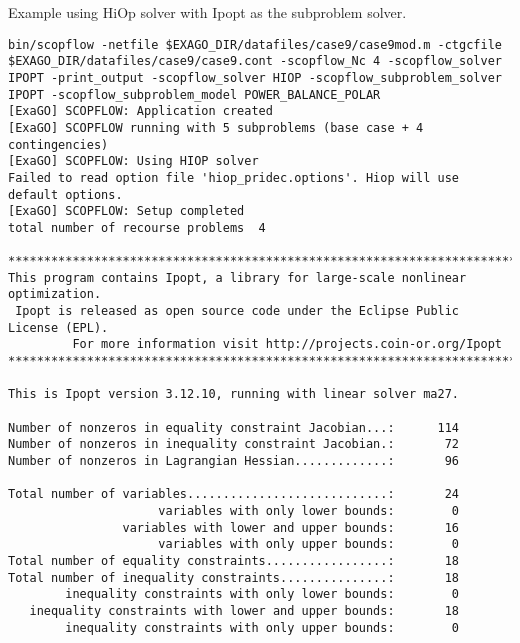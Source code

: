Example using HiOp solver with Ipopt as the subproblem solver.
\begin{lstlisting}
bin/scopflow -netfile $EXAGO_DIR/datafiles/case9/case9mod.m -ctgcfile $EXAGO_DIR/datafiles/case9/case9.cont -scopflow_Nc 4 -scopflow_solver IPOPT -print_output -scopflow_solver HIOP -scopflow_subproblem_solver IPOPT -scopflow_subproblem_model POWER_BALANCE_POLAR
[ExaGO] SCOPFLOW: Application created
[ExaGO] SCOPFLOW running with 5 subproblems (base case + 4 contingencies)
[ExaGO] SCOPFLOW: Using HIOP solver
Failed to read option file 'hiop_pridec.options'. Hiop will use default options.
[ExaGO] SCOPFLOW: Setup completed
total number of recourse problems  4

******************************************************************************
This program contains Ipopt, a library for large-scale nonlinear optimization.
 Ipopt is released as open source code under the Eclipse Public License (EPL).
         For more information visit http://projects.coin-or.org/Ipopt
******************************************************************************

This is Ipopt version 3.12.10, running with linear solver ma27.

Number of nonzeros in equality constraint Jacobian...:      114
Number of nonzeros in inequality constraint Jacobian.:       72
Number of nonzeros in Lagrangian Hessian.............:       96

Total number of variables............................:       24
                     variables with only lower bounds:        0
                variables with lower and upper bounds:       16
                     variables with only upper bounds:        0
Total number of equality constraints.................:       18
Total number of inequality constraints...............:       18
        inequality constraints with only lower bounds:        0
   inequality constraints with lower and upper bounds:       18
        inequality constraints with only upper bounds:        0


\end{lstlisting}
